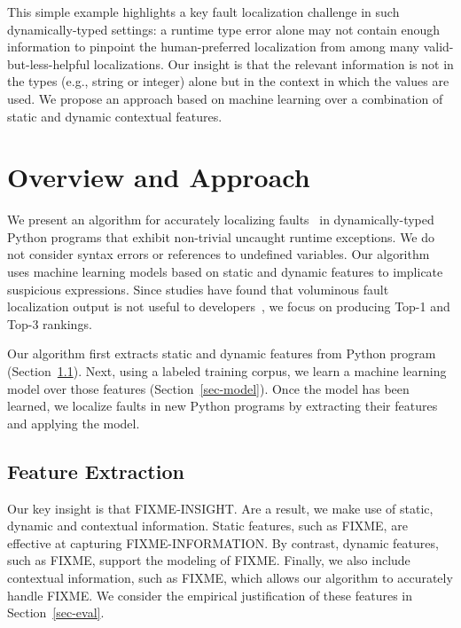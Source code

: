 \documentclass[conference]{IEEEtran}
\begin{document}
This simple example highlights a key fault localization challenge in such
dynamically-typed settings: a runtime type error alone may not contain
enough information to pinpoint the human-preferred localization from among
many valid-but-less-helpful localizations. Our insight is that the relevant
information is not in the types (e.g., string or integer) alone but in the
context in which the values are used.  We propose an approach based on
machine learning over a combination of static and dynamic contextual
features.


\section{Overview and Approach}

We present an algorithm for accurately localizing faults~\cite{tarantula} in
dynamically-typed Python programs that exhibit non-trivial uncaught runtime
exceptions. We do not consider syntax errors or references to undefined
variables. Our algorithm uses machine learning models based on static and
dynamic features to implicate suspicious expressions. Since studies have
found that voluminous fault localization output is not useful to
developers~\cite{orso-parnin,orso-parnin2015}, we focus on producing
Top-1 and Top-3 rankings.

Our algorithm first extracts static and dynamic features from Python
program (Section~\ref{sec-features}). Next, using a labeled training
corpus, we learn a machine learning model over those features
(Section~\ref{sec-model}). Once the model has been learned, we localize
faults in new Python programs by extracting their features and applying the
model.

\subsection{Feature Extraction}
\label{sec-features}

Our key insight is that FIXME-INSIGHT. Are a result, we make use of
static, dynamic and contextual information. Static features, such as FIXME,
are effective at capturing FIXME-INFORMATION. By contrast, dynamic
features, such as FIXME, support the modeling of FIXME. Finally, we also
include contextual information, such as FIXME, which allows our algorithm
to accurately handle FIXME. We consider the empirical justification of
these features in Section~\ref{sec-eval}.
\end{document}
